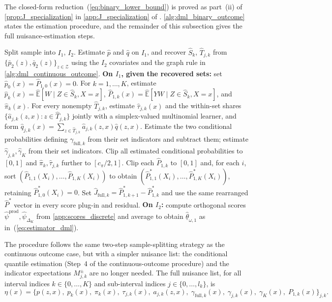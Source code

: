 The closed-form reduction~(\ref{eq:binary_lower_bound}) is proved as part~(ii) of \cref{prop:J_specialization} in \cref{app:J_specialization} of \oalocation. \cref{alg:dml_binary_outcome} states the estimation procedure, and the remainder of this subsection gives the full nuisance-estimation steps.

\begin{algorithm}[h]
\caption{DML estimator: discrete instrument, binary outcome}\label{alg:dml_binary_outcome}
\begin{algorithmic}[1]
\STATE Split sample into $I_1$, $I_2$. Estimate $\hat p$ and $\hat q$ on $I_1$, and recover $\widehat S_k$, $\widehat T_{j,k}$ from $\{\bar p_2(z),\bar q_2(z)\}_{z\in\mathcal Z}$ using the $I_2$ covariates and the graph rule in \cref{alg:dml_continuous_outcome}.
\STATE \textbf{On $I_1$, given the recovered sets:} set $\hat p_0(x)=\hat P_{1,0}(x)=0$. For $k=1,\ldots,K$, estimate $\hat p_k(x)=\widehat{\mathbb E}[W\mid Z\in\widehat S_k,X=x]$, $\hat P_{1,k}(x)=\widehat{\mathbb E}[YW\mid Z\in\widehat S_k,X=x]$, and $\hat\pi_k(x)$. For every nonempty $\widehat T_{j,k}$, estimate $\hat\tau_{j,k}(x)$ and the within-set shares $\{\hat a_{j,k}(z,x):z\in\widehat T_{j,k}\}$ jointly with a simplex-valued multinomial learner, and form $\hat q_{j,k}(x)=\sum_{z\in\widehat T_{j,k}}\hat a_{j,k}(z,x)\hat q(z,x)$. Estimate the two conditional probabilities defining $\gamma_{\mathrm{full},k}$ from their set indicators and subtract them; estimate $\hat\gamma_{j,k},\hat\gamma_K$ from their set indicators. Clip all estimated conditional probabilities to $[0,1]$ and $\hat\pi_k,\hat\tau_{j,k}$ further to $[c_\pi/2,1]$.
\STATE Clip each $\hat P_{1,k}$ to $[0,1]$ and, for each $i$, sort $(\hat P_{1,1}(X_i),\dots,\hat P_{1,K}(X_i))$ to obtain $(\hat P^*_{1,1}(X_i),\dots,\hat P^*_{1,K}(X_i))$, retaining $\hat P^*_{1,0}(X_i)=0$. Set $\hat J_{\mathrm{full},k}=\hat P^*_{1,k+1}-\hat P^*_{1,k}$ and use the same rearranged $\hat P^*$ vector in every score plug-in and residual.
\STATE \textbf{On $I_2$:} compute orthogonal scores $\hat\psi^{\mathrm{prod}}, \hat\psi_{\Delta_K}$ from \cref{app:scores_discrete} and average to obtain $\hat{\underline\theta}_{\omega,1}$ as in~(\ref{eq:estimator_dml}).
\end{algorithmic}
\end{algorithm}

The procedure follows the same two-step sample-splitting strategy as the continuous outcome case, but with a simpler nuisance list: the conditional quantile estimation (Step~4 of the continuous-outcome procedure) and the indicator expectations $M_{j,k}^{\pm}$ are no longer needed. The full nuisance list, for all interval indices $k \in \{0, \dots, K\}$ and sub-interval indices $j \in \{0, \dots, l_k\}$, is
\begin{equation*}
    \eta(x) = \Big\{p(z,x),\; p_k(x),\; \pi_k(x),\; \tau_{j,k}(x),\; a_{j,k}(z,x),\; \gamma_{\text{full},k}(x),\; \gamma_{j,k}(x),\; \gamma_K(x),\; P_{1,k}(x)\Big\}_{j,k}.
\end{equation*}

